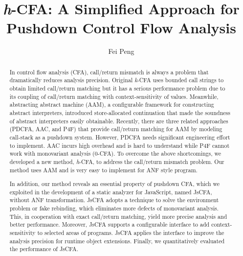 \documentclass{article}
\title{\textit{h}-CFA\@: A Simplified Approach for\\ Pushdown Control Flow Analysis}
\author{Fei Peng}
\begin{document}
\maketitle
\begin{abstract}
  In control flow analysis (CFA), call/return mismatch is always a problem that dramatically reduces analysis precision.
  Original \textit{k}-CFA uses bounded call strings to obtain limited call/return matching but it has a serious performance problem
  due to its coupling of call/return matching with context-sensitivity of values.
  Meanwhile, abstracting abstract machine (AAM), a configurable framework for constructing abstract interpreters,
  introduced store-allocated continuation that made the soundness of abstract interpreters easily obtainable.
  Recently, there are three related approaches (PDCFA, AAC, and P4F) that provide call/return matching for AAM by modeling call-stack as a pushdown system.
  However, PDCFA needs significant engineering effort to implement.
  AAC incurs high overhead and is hard to understand while P4F cannot work with monovariant analysis (0-CFA).
  To overcome the above shortcomings, we developed a new method, \textit{h}-CFA, to address the call/return mismatch problem.
  Our method uses AAM and is very easy to implement for ANF style program.

  In addition, our method reveals an essential property of pushdown CFA,
  which we exploited in the development of a static analyzer for JavaScript, named JsCFA, without ANF transformation.
  JsCFA adopts a technique to solve the environment problem or fake rebinding, which eliminates more defects of monovariant analysis.
  This, in cooperation with exact call/return matching, yield more precise analysis and better performance.
  Moreover, JsCFA supports a configurable interface to add context-sensitivity to selected areas of programs.
  JsCFA applies the interface to improve the analysis precision for runtime object extensions.
  Finally, we quantitatively evaluated the performance of JsCFA\@.
\end{abstract}


\end{document}

